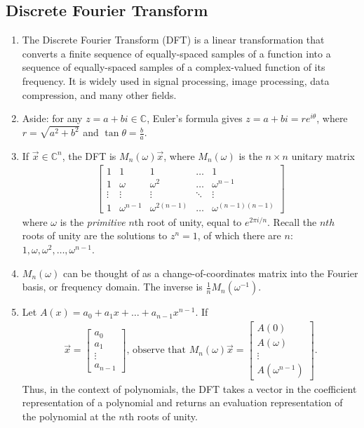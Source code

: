 \documentclass[10pt]{article}
\begin{document}
\begin{multicols}{2}
\begin{addmargin}[0.8em]{0.5em}
    \subsection{Discrete Fourier Transform}
    \begin{enumerate}[label=(\alph*)]
        \item The Discrete Fourier Transform (DFT) is a linear transformation that converts a finite sequence of equally-spaced samples of a function into a sequence of equally-spaced samples of a complex-valued function of its frequency. It is widely used in signal processing, image processing, data compression, and many other fields. 
        \item Aside: for any $z=a+bi \in \mathbb{C}$, Euler's formula gives $z=a+bi=re^{i\theta}$, where $r=\sqrt{a^2+b^2}$ and $\tan{\theta} = \frac{b}{a}$.
        \item If $\vec{x} \in \mathbb{C}^n$, the DFT is $M_n(\omega)\vec{x}$, where $M_n(\omega)$ is the $n\times n$ unitary matrix
        \begin{align*}
        \begin{bmatrix}
        1 & 1 & 1 & \hdots & 1 \\
        1 & \omega & \omega^2 & \hdots & \omega^{n-1} \\
        \vdots & \vdots & \vdots & \ddots & \vdots \\
        1 & \omega^{n-1} & \omega^{2(n-1)} & \hdots & \omega^{(n-1)(n-1)}
        \end{bmatrix}
        \end{align*}
        where $\omega$ is the \textit{primitive} $n$th root of unity, equal to $e^{2\pi i / n}$. Recall the $nth$ roots of unity are the solutions to $z^n=1$, of which there are $n$: $1, \omega, \omega^2, \hdots, \omega^{n-1}$.
        \item $M_n(\omega)$ can be thought of as a change-of-coordinates matrix into the Fourier basis, or frequency domain. The inverse is $\frac{1}{n}M_n(\omega^{-1})$.
        \item Let $A(x) = a_0 + a_1x + \hdots + a_{n-1}x^{n-1}$. If 
        \begin{align*}
        \vec{x} = 
        \begin{bmatrix} a_0 \\ a_1 \\ \vdots \\ a_{n-1} \end{bmatrix} \text{, observe that } 
        M_n(\omega) \vec{x} = 
        \begin{bmatrix} A(0) \\ A(\omega) \\ \vdots \\ A(\omega^{n-1}) \end{bmatrix}.
        \end{align*}
        Thus, in the context of polynomials, the DFT takes a vector in the coefficient representation of a polynomial and returns an evaluation representation of the polynomial at the $n$th roots of unity.
    \end{enumerate}

\end{addmargin}
\end{multicols}
\end{document}
